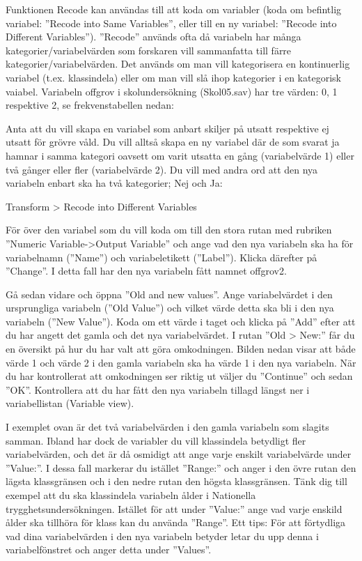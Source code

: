 \documentclass[
]{book}
\begin{document}
Funktionen Recode kan användas till att koda om variabler (koda om befintlig variabel: ''Recode into
Same Variables'', eller till en ny variabel: ''Recode into Different Variables''). ''Recode'' används ofta då
variabeln har många kategorier/variabelvärden som forskaren vill sammanfatta till färre
kategorier/variabelvärden. Det används om man vill kategorisera en kontinuerlig variabel (t.ex.
klassindela) eller om man vill slå ihop kategorier i en kategorisk vaiabel. Variabeln offgrov i
skolundersökning (Skol05.sav) har tre värden: 0, 1 respektive 2, se frekvenstabellen nedan:

Anta att du vill skapa en variabel som anbart skiljer på utsatt respektive ej utsatt för grövre våld. Du vill
alltså skapa en ny variabel där de som svarat ja hamnar i samma kategori oavsett om varit utsatta en
gång (variabelvärde 1) eller två gånger eller fler (variabelvärde 2). Du vill med andra ord att den nya
variabeln enbart ska ha två kategorier; Nej och Ja:

Transform \textgreater{} Recode into Different Variables

För över den variabel som du vill koda om till den stora rutan med rubriken ''Numeric Variable-\textgreater Output
Variable'' och ange vad den nya variabeln ska ha för variabelnamn (''Name'') och variabeletikett
(''Label''). Klicka därefter på ''Change''. I detta fall har den nya variabeln fått namnet offgrov2.

Gå sedan vidare och öppna ''Old and new values''. Ange variabelvärdet i den ursprungliga variabeln
(''Old Value'') och vilket värde detta ska bli i den nya variabeln (''New Value''). Koda om ett värde i
taget och klicka på ''Add'' efter att du har angett det gamla och det nya variabelvärdet. I rutan ''Old \textgreater{} New:''
får du en översikt på hur du har valt att göra omkodningen. Bilden nedan visar att både
värde 1 och värde 2 i den gamla variabeln ska ha värde 1 i den nya variabeln. När du har
kontrollerat att omkodningen ser riktig ut väljer du ''Continue'' och sedan ''OK''. Kontrollera att du
har fått den nya variabeln tillagd längst ner i variabellistan (Variable view).

I exemplet ovan är det två variabelvärden i den gamla variabeln som slagits samman. Ibland har dock de
variabler du vill klassindela betydligt fler variabelvärden, och det är då osmidigt att ange varje enskilt
variabelvärde under ''Value:''. I dessa fall markerar du istället ''Range:'' och anger i den övre rutan den
lägsta klassgränsen och i den nedre rutan den högsta klassgränsen. Tänk dig till exempel att du ska
klassindela variabeln ålder i Nationella trygghetsundersökningen. Istället för att under ''Value:'' ange
vad varje enskild ålder ska tillhöra för klass kan du använda ''Range''. Ett tips: För att förtydliga vad dina
variabelvärden i den nya variabeln betyder letar du upp denna i variabelfönstret och anger detta under
''Values''.
\end{document}
